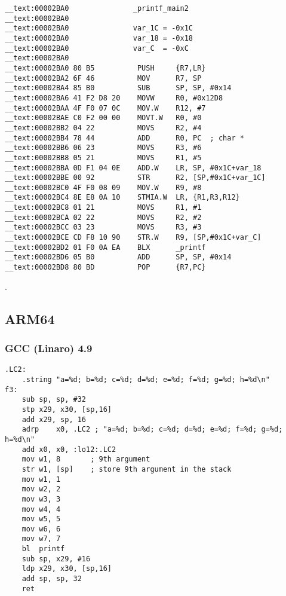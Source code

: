 \begin{lstlisting}
__text:00002BA0               _printf_main2
__text:00002BA0
__text:00002BA0               var_1C = -0x1C
__text:00002BA0               var_18 = -0x18
__text:00002BA0               var_C  = -0xC
__text:00002BA0
__text:00002BA0 80 B5          PUSH     {R7,LR}
__text:00002BA2 6F 46          MOV      R7, SP
__text:00002BA4 85 B0          SUB      SP, SP, #0x14
__text:00002BA6 41 F2 D8 20    MOVW     R0, #0x12D8
__text:00002BAA 4F F0 07 0C    MOV.W    R12, #7
__text:00002BAE C0 F2 00 00    MOVT.W   R0, #0
__text:00002BB2 04 22          MOVS     R2, #4
__text:00002BB4 78 44          ADD      R0, PC  ; char *
__text:00002BB6 06 23          MOVS     R3, #6
__text:00002BB8 05 21          MOVS     R1, #5
__text:00002BBA 0D F1 04 0E    ADD.W    LR, SP, #0x1C+var_18
__text:00002BBE 00 92          STR      R2, [SP,#0x1C+var_1C]
__text:00002BC0 4F F0 08 09    MOV.W    R9, #8
__text:00002BC4 8E E8 0A 10    STMIA.W  LR, {R1,R3,R12}
__text:00002BC8 01 21          MOVS     R1, #1
__text:00002BCA 02 22          MOVS     R2, #2
__text:00002BCC 03 23          MOVS     R3, #3
__text:00002BCE CD F8 10 90    STR.W    R9, [SP,#0x1C+var_C]
__text:00002BD2 01 F0 0A EA    BLX      _printf
__text:00002BD6 05 B0          ADD      SP, SP, #0x14
__text:00002BD8 80 BD          POP      {R7,PC}
\end{lstlisting}

.

\subsection{ARM64}

\subsubsection{\NonOptimizing GCC (Linaro) 4.9}

\begin{lstlisting}
.LC2:
	.string	"a=%d; b=%d; c=%d; d=%d; e=%d; f=%d; g=%d; h=%d\n"
f3:
	sub	sp, sp, #32
	stp	x29, x30, [sp,16]
	add	x29, sp, 16
	adrp	x0, .LC2 ; "a=%d; b=%d; c=%d; d=%d; e=%d; f=%d; g=%d; h=%d\n"
	add	x0, x0, :lo12:.LC2
	mov	w1, 8		; 9th argument
	str	w1, [sp]	; store 9th argument in the stack
	mov	w1, 1
	mov	w2, 2
	mov	w3, 3
	mov	w4, 4
	mov	w5, 5
	mov	w6, 6
	mov	w7, 7
	bl	printf
	sub	sp, x29, #16
	ldp	x29, x30, [sp,16]
	add	sp, sp, 32
	ret
\end{lstlisting}

